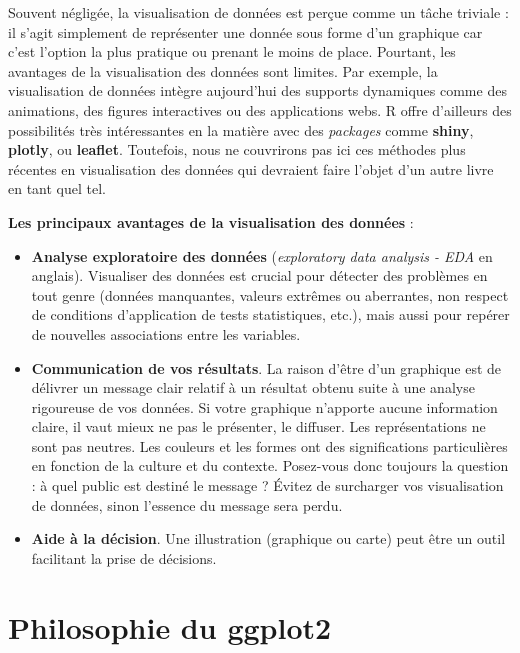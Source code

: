 \documentclass[
  11pt,
  french,
]{book}
\makeatletter
\providecommand{\tightlist}{%
  \setlength{\itemsep}{0pt}\setlength{\parskip}{0pt}}
\newenvironment{kframev}{%
\medskip{}
\setlength{\fboxsep}{.8em}
 \def\at@end@of@kframev{}%
 \ifinner\ifhmode%
  \def\at@end@of@kframev{\end{minipage}}%
  \begin{minipage}{\columnwidth}%
 \fi\fi%
 \def\FrameCommand##1{\hskip\@totalleftmargin \hskip-\fboxsep
 \colorbox{shadebluecolor}{##1}\hskip-\fboxsep
     \hskip-\linewidth \hskip-\@totalleftmargin \hskip\columnwidth}%
 \MakeFramed {\advance\hsize-\width
   \@totalleftmargin\z@ \linewidth\hsize
   \@setminipage}}%
 {\par\unskip\endMakeFramed%
 \at@end@of@kframev}
\newenvironment{rmdblock}[1]
  {
  \begin{itemize}
  \renewcommand{\labelitemi}{
    \raisebox{-.7\height}[0pt][0pt]{
      {\setkeys{Gin}{width=3em,keepaspectratio}\texttt{[image: images/\#1]}}
    }
  }
  \setlength{\fboxsep}{1em}
  \begin{kframev}
  \small
  \item
  }
  {
  \end{kframev}
  \end{itemize}
  }
\newenvironment{bloc_notes}
  {\begin{rmdblock}{notes}}
  {\end{rmdblock}}
\makeatother
\begin{document}
\begin{bloc_notes}
Souvent négligée, la visualisation de données est perçue comme un tâche triviale : il s'agit simplement de représenter une donnée sous forme d'un graphique car c'est l'option la plus pratique ou prenant le moins de place. Pourtant, les avantages de la visualisation des données sont limites. Par exemple, la visualisation de données intègre aujourd'hui des supports dynamiques comme des animations, des figures interactives ou des applications webs. R offre d'ailleurs des possibilités très intéressantes en la matière avec des \emph{packages} comme \textbf{shiny}, \textbf{plotly}, ou \textbf{leaflet}. Toutefois, nous ne couvrirons pas ici ces méthodes plus récentes en visualisation des données qui devraient faire l'objet d'un autre livre en tant quel tel.

\textbf{Les principaux avantages de la visualisation des données} :

\begin{itemize}
\tightlist
\item
  \textbf{Analyse exploratoire des données} (\emph{exploratory data analysis - EDA} en anglais). Visualiser des données est crucial pour détecter des problèmes en tout genre (données manquantes, valeurs extrêmes ou aberrantes, non respect de conditions d'application de tests statistiques, etc.), mais aussi pour repérer de nouvelles associations entre les variables.
\item
  \textbf{Communication de vos résultats}. La raison d'être d'un graphique est de délivrer un message clair relatif à un résultat obtenu suite à une analyse rigoureuse de vos données. Si votre graphique n'apporte aucune information claire, il vaut mieux ne pas le présenter, le diffuser. Les représentations ne sont pas neutres. Les couleurs et les formes ont des significations particulières en fonction de la culture et du contexte. Posez-vous donc toujours la question : à quel public est destiné le message ? Évitez de surcharger vos visualisation de données, sinon l'essence du message sera perdu.
\item
  \textbf{Aide à la décision}. Une illustration (graphique ou carte) peut être un outil facilitant la prise de décisions.
\end{itemize}

\end{bloc_notes}

\hypertarget{sect031}{%
\section{Philosophie du ggplot2}\label{sect031}}
\end{document}
